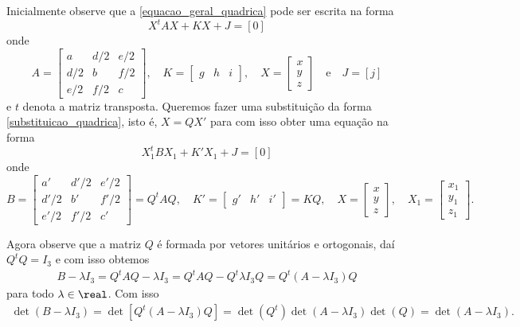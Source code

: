 Inicialmente observe que a \eqref{equacao_geral_quadrica} pode ser escrita na forma
\begin{equation}\label{equacao_matricial_quadrica}
    X^tAX + KX + J = [0]
\end{equation}
onde
\[
    A = \begin{bmatrix}
        a   & d/2 & e/2 \\
        d/2 & b   & f/2 \\
        e/2 & f/2 & c
    \end{bmatrix}
    , \quad K = \begin{bmatrix}
        g & h & i
    \end{bmatrix}, \quad X = \begin{bmatrix}
        x \\
        y \\
        z
    \end{bmatrix}\quad\mbox{e}\quad J = [j]
\]
e $t$ denota a matriz transposta. Queremos fazer uma substituição da forma \eqref{substituicao_quadrica}, isto é, $X = QX'$ para com isso obter uma equação na forma
\[
    X_1^tBX_1 + K'X_1 + J = [0]
\]
onde
\[
    B = \begin{bmatrix}
        a'   & d'/2 & e'/2 \\
        d'/2 & b'   & f'/2 \\
        e'/2 & f'/2 & c'
    \end{bmatrix} = Q^tAQ,\quad K' = \begin{bmatrix}
        g' & h' & i'
    \end{bmatrix} = KQ,\quad X = \begin{bmatrix}
        x \\y\\z
    \end{bmatrix},\quad X_1 = \begin{bmatrix}
        x_1 \\y_1\\z_1
    \end{bmatrix}.
\]

Agora observe que a matriz $Q$ é formada por vetores unitários e ortogonais, daí $Q^tQ = I_3$ e com isso obtemos
\begin{align*}
    B - \lambda I_3 = Q^t A Q - \lambda I_3 = Q^t A Q - Q^t\lambda I_3 Q = Q^t (A - \lambda I_3)Q
\end{align*}
para todo $\lambda \in \real$. Com isso
\begin{align*}
    \det(B - \lambda I_3) = \det[Q^t(A - \lambda I_3)Q] = \det(Q^t)\det(A - \lambda I_3)\det(Q) = \det(A - \lambda I_3).
\end{align*}

